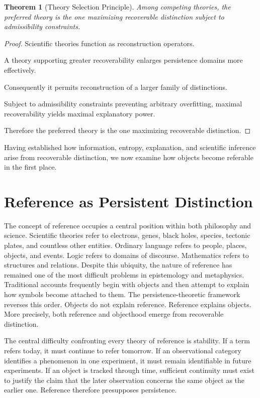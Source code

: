 \documentclass[12pt,oneside]{article}
\newtheorem{theorem}{Theorem}[section] \newtheorem{lemma}[theorem]{Lemma} \newtheorem{proposition}[theorem]{Proposition} \newtheorem{corollary}[theorem]{Corollary}
\theoremstyle{definition}
\begin{document}
\begin{theorem}[Theory Selection Principle]

Among competing theories, the preferred theory is the one maximizing recoverable distinction subject to admissibility constraints.

\end{theorem}

\begin{proof}

Scientific theories function as reconstruction operators.

A theory supporting greater recoverability enlarges persistence domains more effectively.

Consequently it permits reconstruction of a larger family of distinctions.

Subject to admissibility constraints preventing arbitrary overfitting, maximal recoverability yields maximal explanatory power.

Therefore the preferred theory is the one maximizing recoverable distinction.

\end{proof}

Having established how information, entropy, explanation, and scientific inference arise from recoverable distinction, we now examine how objects become referable in the first place.

\section{Reference as Persistent Distinction}

The concept of reference occupies a central position within both philosophy and science. Scientific theories refer to electrons, genes, black holes, species, tectonic plates, and countless other entities. Ordinary language refers to people, places, objects, and events. Logic refers to domains of discourse. Mathematics refers to structures and relations. Despite this ubiquity, the nature of reference has remained one of the most difficult problems in epistemology and metaphysics. Traditional accounts frequently begin with objects and then attempt to explain how symbols become attached to them. The persistence-theoretic framework reverses this order. Objects do not explain reference. Reference explains objects. More precisely, both reference and objecthood emerge from recoverable distinction.

The central difficulty confronting every theory of reference is stability. If a term refers today, it must continue to refer tomorrow. If an observational category identifies a phenomenon in one experiment, it must remain identifiable in future experiments. If an object is tracked through time, sufficient continuity must exist to justify the claim that the later observation concerns the same object as the earlier one. Reference therefore presupposes persistence.
\end{document}
